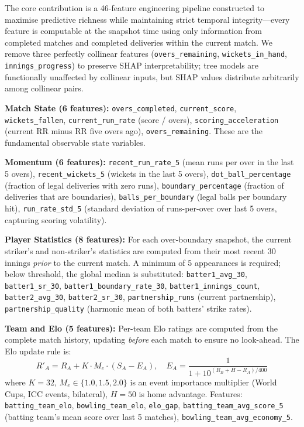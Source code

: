 \documentclass[10pt,a4paper,twocolumn]{article}
\begin{document}
The core contribution is a 46-feature engineering pipeline constructed to maximise predictive richness while maintaining strict temporal integrity---every feature is computable at the snapshot time using only information from completed matches and completed deliveries within the current match. We remove three perfectly collinear features (\texttt{overs\_remaining}, \texttt{wickets\_in\_hand}, \texttt{innings\_progress}) to preserve SHAP interpretability; tree models are functionally unaffected by collinear inputs, but SHAP values distribute arbitrarily among collinear pairs.

\textbf{Match State (6 features):} \texttt{overs\_completed}, \texttt{current\_score}, \texttt{wickets\_fallen}, \texttt{current\_run\_rate} (score / overs), \texttt{scoring\_acceleration} (current RR minus RR five overs ago), \texttt{overs\_remaining}. These are the fundamental observable state variables.

\textbf{Momentum (6 features):} \texttt{recent\_run\_rate\_5} (mean runs per over in the last 5 overs), \texttt{recent\_wickets\_5} (wickets in the last 5 overs), \texttt{dot\_ball\_percentage} (fraction of legal deliveries with zero runs), \texttt{boundary\_percentage} (fraction of deliveries that are boundaries), \texttt{balls\_per\_boundary} (legal balls per boundary hit), \texttt{run\_rate\_std\_5} (standard deviation of runs-per-over over last 5 overs, capturing scoring volatility).

\textbf{Player Statistics (8 features):} For each over-boundary snapshot, the current striker's and non-striker's statistics are computed from their most recent 30 innings \emph{prior} to the current match. A minimum of 5 appearances is required; below threshold, the global median is substituted: \texttt{batter1\_avg\_30}, \texttt{batter1\_sr\_30}, \texttt{batter1\_boundary\_rate\_30}, \texttt{batter1\_innings\_count}, \texttt{batter2\_avg\_30}, \texttt{batter2\_sr\_30}, \texttt{partnership\_runs} (current partnership), \texttt{partnership\_quality} (harmonic mean of both batters' strike rates).

\textbf{Team and Elo (5 features):} Per-team Elo ratings are computed from the complete match history, updating \emph{before} each match to ensure no look-ahead. The Elo update rule is:
\begin{equation}
R'_A = R_A + K \cdot M_e \cdot (S_A - E_A), \quad E_A = \frac{1}{1 + 10^{(R_B + H - R_A)/400}}
\end{equation}
where $K=32$, $M_e \in \{1.0, 1.5, 2.0\}$ is an event importance multiplier (World Cups, ICC events, bilateral), $H=50$ is home advantage. Features: \texttt{batting\_team\_elo}, \texttt{bowling\_team\_elo}, \texttt{elo\_gap}, \texttt{batting\_team\_avg\_score\_5} (batting team's mean score over last 5 matches), \texttt{bowling\_team\_avg\_economy\_5}.
\end{document}
